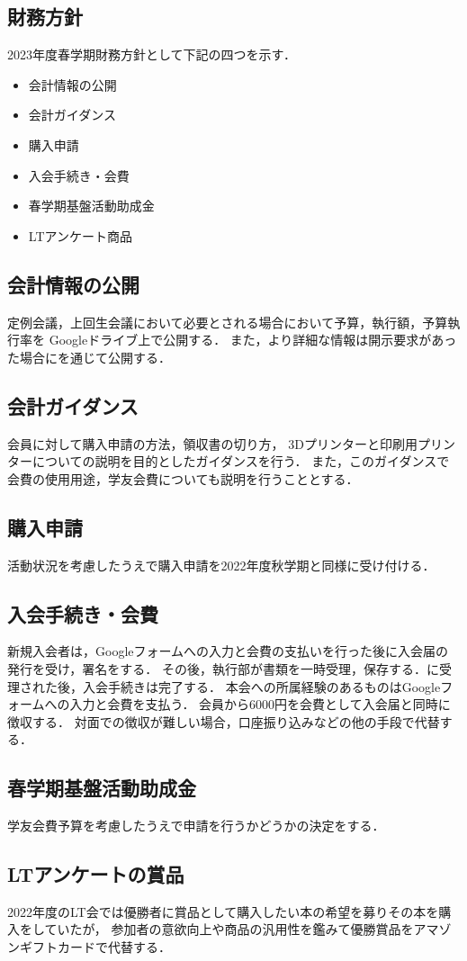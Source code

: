 \subsection*{財務方針}


2023年度春学期財務方針として下記の四つを示す．
\begin{itemize}
    \item 会計情報の公開
    \item 会計ガイダンス
    \item 購入申請
    \item 入会手続き・会費
    \item 春学期基盤活動助成金
    \item LTアンケート商品
\end{itemize}

\subsection*{会計情報の公開}
定例会議，上回生会議において必要とされる場合において予算，執行額，予算執行率を Googleドライブ上で公開する．
また，より詳細な情報は開示要求があった場合に\kaikeiStaff{}を通じて公開する．

\subsection*{会計ガイダンス}
会員に対して購入申請の方法，領収書の切り方， 3Dプリンターと印刷用プリンターについての説明を目的としたガイダンスを行う．
また，このガイダンスで会費の使用用途，学友会費についても説明を行うこととする．

\subsection*{購入申請}
活動状況を考慮したうえで購入申請を2022年度秋学期と同様に受け付ける．

\subsection*{入会手続き・会費}
新規入会者は，Googleフォームへの入力と会費の支払いを行った後に入会届の発行を受け，署名をする．
その後，執行部が書類を一時受理，保存する．\president{}に受理された後，入会手続きは完了する．
本会への所属経験のあるものはGoogleフォームへの入力と会費を支払う．
会員から6000円を会費として入会届と同時に徴収する．
対面での徴収が難しい場合，口座振り込みなどの他の手段で代替する．

\subsection*{春学期基盤活動助成金}
学友会費予算を考慮したうえで申請を行うかどうかの決定をする．

\subsection*{LTアンケートの賞品}
2022年度のLT会では優勝者に賞品として購入したい本の希望を募りその本を購入をしていたが，
参加者の意欲向上や商品の汎用性を鑑みて優勝賞品をアマゾンギフトカードで代替する．
